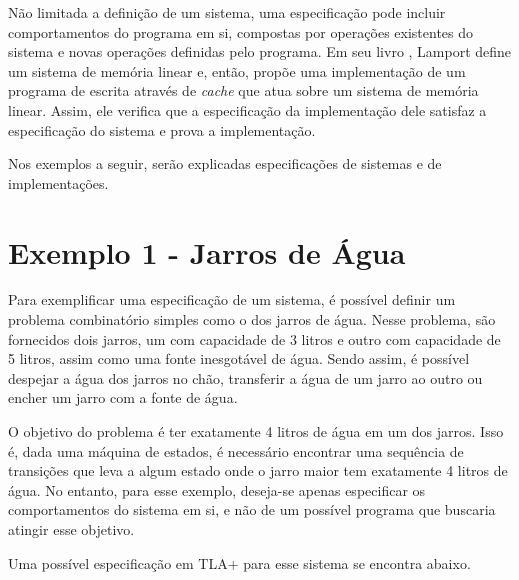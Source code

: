 Não limitada a definição de um sistema, uma especificação pode incluir comportamentos do programa em si, compostas por operações existentes do sistema e novas operações definidas pelo programa. Em seu livro \cite{specifying-systems}, Lamport define um sistema de memória linear e, então, propõe uma implementação de um programa de escrita através de \textit{cache} que atua sobre um sistema de memória linear. Assim, ele verifica que a especificação da implementação dele satisfaz a especificação do sistema e prova a implementação.

Nos exemplos a seguir, serão explicadas especificações de sistemas e de implementações.

\section{Exemplo 1 - Jarros de Água}

Para exemplificar uma especificação de um sistema, é possível definir um problema combinatório simples como o dos jarros de água. Nesse problema, são fornecidos dois jarros, um com capacidade de 3 litros e outro com capacidade de 5 litros, assim como uma fonte inesgotável de água. Sendo assim, é possível despejar a água dos jarros no chão, transferir a água de um jarro ao outro ou encher um jarro com a fonte de água.

O objetivo do problema é ter exatamente 4 litros de água em um dos jarros. Isso é, dada uma máquina de estados, é necessário encontrar uma sequência de transições que leva a algum estado onde o jarro maior tem exatamente 4 litros de água. No entanto, para esse exemplo, deseja-se apenas especificar os comportamentos do sistema em si, e não de um possível programa que buscaria atingir esse objetivo.

Uma possível especificação em TLA+ para esse sistema se encontra abaixo.

